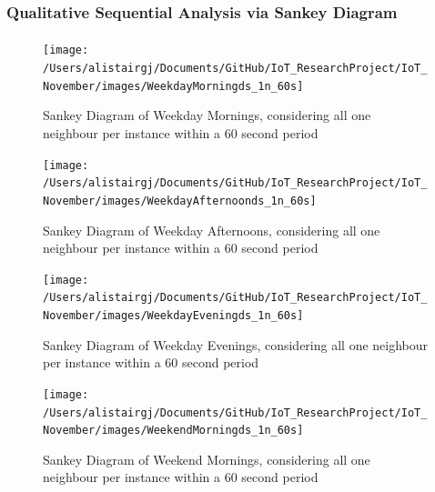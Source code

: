 \documentclass[11pt,]{article}
\let\oldparagraph\paragraph
\renewcommand{\paragraph}[1]{\oldparagraph{#1}\mbox{}}
\begin{document}
\pagebreak

\hypertarget{qualitative-sequential-analysis-via-sankey-diagram}{%
\subsubsection{Qualitative Sequential Analysis via Sankey
Diagram}\label{qualitative-sequential-analysis-via-sankey-diagram}}

\hypertarget{section}{%
\paragraph{}\label{section}}

\begin{figure}[H]

{\centering \texttt{[image: /Users/alistairgj/Documents/GitHub/IoT\_ResearchProject/IoT\_November/images/WeekdayMorningds\_1n\_60s]} 

}

\caption{Sankey Diagram of Weekday Mornings, considering all one neighbour per instance within a 60 second period}\label{fig:sankey_WeekdayMorningds_1n_60s}
\end{figure}

\begin{figure}[H]

{\centering \texttt{[image: /Users/alistairgj/Documents/GitHub/IoT\_ResearchProject/IoT\_November/images/WeekdayAfternoonds\_1n\_60s]} 

}

\caption{Sankey Diagram of Weekday Afternoons, considering all one neighbour per instance within a 60 second period}\label{fig:sankey_WeekdayAfternoonds_1n_60s}
\end{figure}

\begin{figure}[H]

{\centering \texttt{[image: /Users/alistairgj/Documents/GitHub/IoT\_ResearchProject/IoT\_November/images/WeekdayEveningds\_1n\_60s]} 

}

\caption{Sankey Diagram of Weekday Evenings, considering all one neighbour per instance within a 60 second period}\label{fig:sankey_WeekdayEveningds_1n_60s}
\end{figure}

\begin{figure}[H]

{\centering \texttt{[image: /Users/alistairgj/Documents/GitHub/IoT\_ResearchProject/IoT\_November/images/WeekendMorningds\_1n\_60s]} 

}

\caption{Sankey Diagram of Weekend Mornings, considering all one neighbour per instance within a 60 second period}\label{fig:sankey_WeekendMorningds_1n_60s}
\end{figure}
\end{document}
